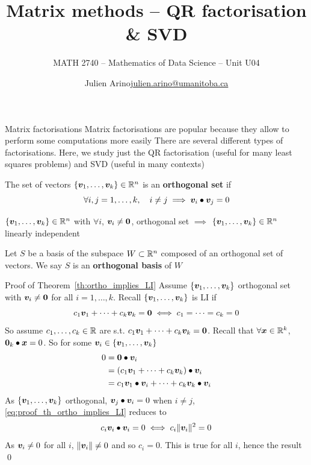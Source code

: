 \documentclass[aspectratio=169]{beamer}\usepackage[]{graphicx}\usepackage[]{xcolor}
\subtitle{MATH 2740 -- Mathematics of Data Science -- Unit U04}
\author{\texorpdfstring{Julien Arino\newline\url{julien.arino@umanitoba.ca}}{Julien Arino}}
\institute{Department of Mathematics @ University of Manitoba}
\title{Matrix methods -- QR factorisation \& SVD}
\begin{document}
\setcounter{theorem}{56}

\SStitlepage
\SSoutlinepage


\begin{frame}{Matrix factorisations}
	Matrix factorisations are popular because they allow to perform some computations more easily
	\vfill
	There are several different types of factorisations. Here, we study just the QR factorisation (useful for many least squares problems) and SVD (useful in many contexts)
\end{frame}	
	



\begin{frame}
\begin{importantdefinition}
The set of vectors $\{\bm{v}_1,\ldots,\bm{v}_k\}\in\mathbb{R}^n$ is an \textbf{orthogonal set} if
\[
\forall i,j=1,\ldots,k,\quad i\neq j \implies \bm{v}_i\bullet\bm{v}_j=0
\]
\end{importantdefinition}
\vfill
\begin{theorem}\label{th:ortho_implies_LI}
$\{\bm{v}_1,\ldots,\bm{v}_k\}\in\mathbb{R}^n$ with $\forall i$, $\bv_i\neq\b0$, orthogonal set $\implies$ $\{\bm{v}_1,\ldots,\bm{v}_k\}\in\mathbb{R}^n$ linearly independent
\end{theorem}
\vfill
\begin{definition}
Let $S$ be a basis of the subspace $W\subset\mathbb{R}^n$ composed of an orthogonal set of vectors. We say $S$ is an \textbf{orthogonal basis} of $W$
\end{definition}
\end{frame}

\begin{frame}{Proof of Theorem~\ref{th:ortho_implies_LI}}
Assume $\{\bm{v}_1,\ldots,\bm{v}_k\}$ orthogonal set with $\bv_i\neq\b0$ for all $i=1,\ldots,k$. Recall $\{\bm{v}_1,\ldots,\bm{v}_k\}$ is LI if 
\[
c_1\bv_1+\cdots+c_k\bv_k=\b0\iff c_1=\cdots=c_k=0
\]
So assume $c_1,\ldots,c_k\in\mathbb{R}$ are s.t. $c_1\bv_1+\cdots+c_k\bv_k=\b0$.
Recall that $\forall\bm{x}\in\mathbb{R}^k$, $\b0_k\bullet\bx=0$. So for some $\bm{v}_i\in\{\bm{v}_1,\ldots,\bm{v}_k\}$
\begin{align}
0 &= \b0\bullet\bv_i \nonumber \\
&= (c_1\bv_1+\cdots+c_k\bv_k)\bullet\bv_i \nonumber \\
&= c_1\bv_1\bullet\bv_i+\cdots+c_k\bv_k\bullet\bv_i \label{eq:proof_th_ortho_implies_LI}
\end{align}
As $\{\bm{v}_1,\ldots,\bm{v}_k\}$ orthogonal, $\bm{v}_j\bullet\bm{v}_i=0$ when $i\neq j$, \eqref{eq:proof_th_ortho_implies_LI} reduces to
\[
c_i\bm{v}_i\bullet\bm{v}_i = 0 \iff c_i\|\bm{v}_i\|^2 = 0
\]
As $\bm{v}_i\neq 0$ for all $i$, $\|\bm{v}_i\|\neq 0$ and so $c_i=0$. This is true for all $i$, hence the result \hfill\qed
\end{frame}
\end{document}

